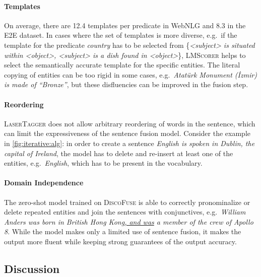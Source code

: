 \paragraph{Templates} On average, there are 12.4 templates per predicate in WebNLG and 8.3 in the E2E dataset. In cases where the set of templates is more diverse, e.g.\ if the template for the predicate \textit{country} has to be selected from \{\textit{<subject> is situated within <object>, <subject> is a dish found in <object>}\}, \textsc{LMScorer} helps to select the semantically accurate template for the specific entities. The literal copying of entities can be too rigid in some cases, e.g.\ \textit{Atatürk Monument (İzmir) is made of ``Bronze''}, but these disfluencies can be improved in the fusion step.

\paragraph{Reordering} \textsc{LaserTagger} does not allow arbitrary reordering of words in the sentence, which can limit the expressiveness of the sentence fusion model. Consider the example in \autoref{fig:iterative:alg}: in order to create a sentence \textit{English is spoken in Dublin, the capital of Ireland}, the model has to delete and re-insert at least one of the entities, e.g.\ \textit{English}, which has to be present in the vocabulary.

\paragraph{Domain Independence} The zero-shot model trained on \textsc{DiscoFuse} is able to correctly pronominalize or delete repeated entities and join the sentences with conjunctives, e.g.\ \textit{William Anders was born in British Hong Kong\underline{, and was} a member of the crew of Apollo 8}. While the model makes only a limited use of sentence fusion, it makes the output more fluent while keeping strong guarantees of the output accuracy.

\subsection{Discussion}

